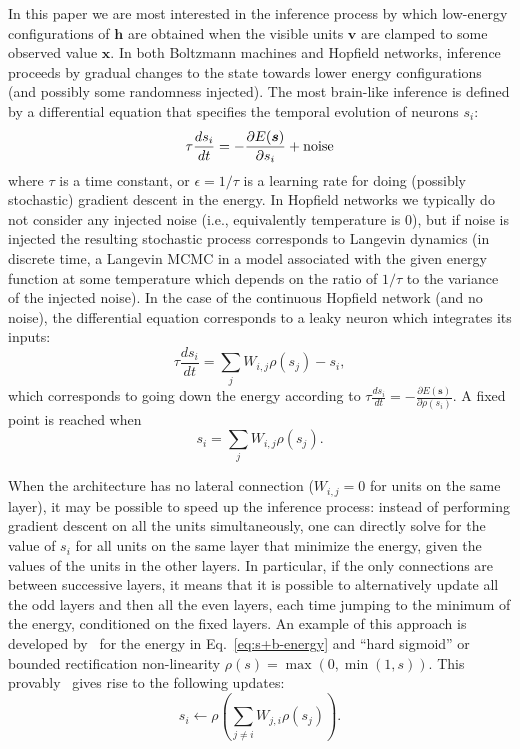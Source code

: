 \documentclass{article}
\newcommand   \vv{{\bm v}}
\newcommand   \vx{{\bm x}}
\newcommand   \vh{{\bm h}}
\newcommand   \vs{{\bm s}}
\begin{document}
In this paper we are most interested in the inference process by which low-energy
configurations of $\vh$ are obtained when the visible units $\vv$ are clamped
to some observed value $\vx$. In both Boltzmann machines and Hopfield networks,
inference proceeds by gradual changes to the state towards lower energy
configurations (and possibly some randomness injected). The most brain-like
inference is defined by a differential equation that specifies the temporal
evolution of neurons $s_i$:
\begin{equation}
  \label{eq:dsdt}
  \tau \frac{ds_i}{dt} = - \frac{\partial E(\vs)}{\partial s_i} + {\rm noise}
\end{equation}
where $\tau$ is a time constant, or $\epsilon=1/\tau$ is a learning rate for doing
(possibly stochastic) gradient descent in the energy. In Hopfield networks we
typically do not consider any injected noise (i.e., equivalently temperature is 0), but if noise is injected the resulting
stochastic process corresponds to Langevin dynamics (in discrete time, a Langevin
MCMC in a model associated with the given energy function at some temperature which
depends on the ratio of $1/\tau$ to the variance of the injected noise).
In the case of the continuous Hopfield network (and no noise), the differential equation corresponds
to a leaky neuron which integrates its inputs:
\begin{equation}
  \tau \frac{ds_i}{dt} = \sum_j W_{i,j} \rho(s_j) - s_i,
\end{equation}
which corresponds to going down the energy according to
$\tau \frac{ds_i}{dt} = - \frac{\partial E(\vs)}{\partial \rho(s_i)}$. A fixed
point is reached when
\begin{equation}
   s_i = \sum_j W_{i,j} \rho(s_j).
\end{equation}

When the architecture has no lateral connection ($W_{i,j}=0$ for units on the same layer),
it may be possible to speed up the inference process: instead of performing
gradient descent on all the units simultaneously, one can directly solve
for the value of $s_i$ for all units on the same layer that minimize the
energy, given the values of the units in the other layers. In particular,
if the only connections are between successive layers, it means that it is
possible to alternatively update all the odd layers and then all the even
layers, each time jumping to the minimum of the energy, conditioned on
the fixed layers. An example of this approach is developed by~\citet{Scellier+Bengio-arxiv2016}
for the energy in Eq.~\ref{eq:s+b-energy} and ``hard sigmoid''
or bounded rectification non-linearity $\rho(s)=\max(0,\min(1,s))$.
This provably~\citep{Scellier+Bengio-arxiv2016} gives rise to the following updates:
\begin{equation}
  \label{eq:direct}
   s_i \leftarrow \rho(\sum_{j\neq i} W_{j,i} \rho(s_j)). %
\end{equation}
\end{document}
